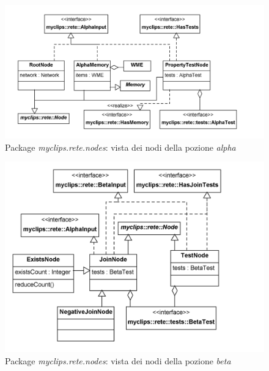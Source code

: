 \begin{figure}
\centering
\includegraphics[width=1\textwidth]{Immagini/Capitolo3/Classi/myclips_rete_nodes_Nodi-Alpha.png}
\caption{Package \emph{myclips.rete.nodes}: vista dei nodi della pozione \emph{alpha}}\label{fig:class-myclips-rete-nodes-alpha}
\end{figure}

\begin{figure}
\centering
\includegraphics[width=1\textwidth]{Immagini/Capitolo3/Classi/myclips_rete_nodes_Join-Tests-Exists-Negative-Nodes.png}
\caption{Package \emph{myclips.rete.nodes}: vista dei nodi della pozione \emph{beta}}\label{fig:class-myclips-rete-nodes-beta}
\end{figure}


